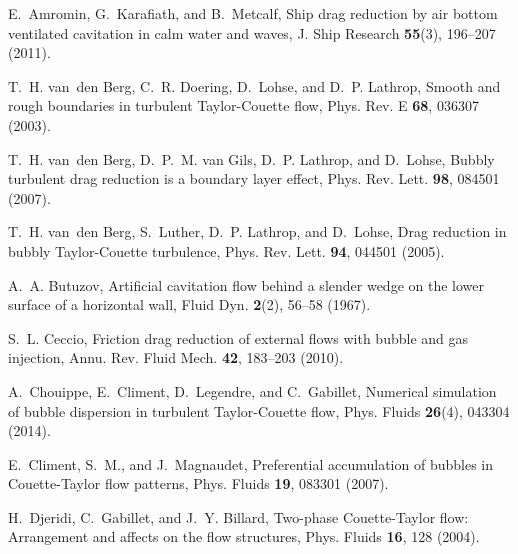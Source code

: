 \documentclass[aps,onecolumn,10pt, floatfix, superscriptaddress,longbibliography, pra]{revtex4-1}
\begin{document}
%
\begin{thebibliography}{44}
\providecommand{\natexlab}[1]{#1}

E.~Amromin, G.~Karafiath, and B.~Metcalf, Ship drag reduction by air bottom
  ventilated cavitation in calm water and waves, {J. Ship Research}
  \textbf{55}(3), 196--207 (2011).

T.~H. van~den Berg, C.~R. Doering, D.~Lohse, and D.~P. Lathrop, Smooth and
  rough boundaries in turbulent {{Taylor-Couette}} flow, Phys. Rev. E
  \textbf{68}, 036307 (2003).

T.~H. van~den Berg, D.~P.~M. van Gils, D.~P. Lathrop, and D.~Lohse, Bubbly
  turbulent drag reduction is a boundary layer effect, Phys. Rev. Lett.
  \textbf{98}, 084501 (2007).

T.~H. van~den Berg, S.~Luther, D.~P. Lathrop, and D.~Lohse, {Drag reduction in
  bubbly Taylor-Couette turbulence}, Phys. Rev. Lett. \textbf{94}, 044501
  (2005).

A.~A. Butuzov, Artificial cavitation flow behind a slender wedge on the lower
  surface of a horizontal wall, Fluid Dyn. \textbf{2}(2), 56--58 (1967).

S.~L. Ceccio, Friction drag reduction of external flows with bubble and gas
  injection, Annu. Rev. Fluid Mech. \textbf{42}, 183--203 (2010).

A.~Chouippe, E.~Climent, D.~Legendre, and C.~Gabillet, Numerical simulation of
  bubble dispersion in turbulent {{Taylor-Couette}} flow, Phys. Fluids
  \textbf{26}(4), 043304 (2014).

E.~Climent, S.~M., and J.~Magnaudet, Preferential accumulation of bubbles in
  {Couette-Taylor} flow patterns, {Phys. Fluids} \textbf{19}, 083301 (2007).

H.~Djeridi, C.~Gabillet, and J.~Y. Billard, {Two-phase Couette-Taylor flow:
  Arrangement and affects on the flow structures}, {Phys. Fluids} \textbf{16},
  128 (2004).


\end{thebibliography}
\end{document}

